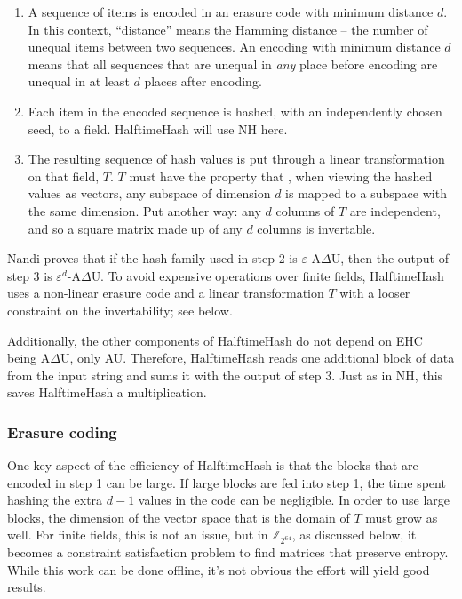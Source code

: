 \documentclass[sigconf, nonacm]{acmart}
\newcommand{\ints}{\mathbb{Z}}
\begin{document}
\begin{enumerate}
\item A sequence of items is encoded in an erasure code with minimum distance $d$.
  In this context, ``distance'' means the Hamming distance -- the number of unequal items between two sequences.
  An encoding with minimum distance $d$ means that all sequences that are unequal in {\em any} place before encoding are unequal in at least $d$ places after encoding.
\item Each item in the encoded sequence is hashed, with an independently chosen seed, to a field.
  HalftimeHash will use NH here.
\item The resulting sequence of hash values is put through a linear transformation on that field, $T$.
  $T$ must have the property that , when viewing the hashed values as vectors, any subspace of dimension $d$ is mapped to a subspace with the same dimension.
  Put another way: any $d$ columns of $T$ are independent, and so a square matrix made up of any $d$ columns is invertable.
\end{enumerate}

Nandi proves that if the hash family used in step 2 is $\varepsilon$-A$\Delta$U, then the output of step 3 is $\varepsilon^d$-A$\Delta$U.
To avoid expensive operations over finite fields, HalftimeHash uses a non-linear erasure code and a linear transformation $T$ with a looser constraint on the invertability; see below.

Additionally, the other components of HalftimeHash do not depend on EHC being A$\Delta$U, only AU.
Therefore, HalftimeHash reads one additional block of data from the input string and sums it with the output of step 3.
Just as in NH, this saves HalftimeHash a multiplication.

\subsubsection{Erasure coding}

One key aspect of the efficiency of HalftimeHash is that the blocks that are encoded in step 1 can be large.
If large blocks are fed into step 1, the time spent hashing the extra $d - 1$ values in the code can be negligible.
In order to use large blocks, the dimension of the vector space that is the domain of $T$ must grow as well.
For finite fields, this is not an issue, but in $\ints_{2^{64}}$, as discussed below, it becomes a constraint satisfaction problem to find matrices that preserve entropy.
While this work can be done offline, it's not obvious the effort will yield good results.
\end{document}
